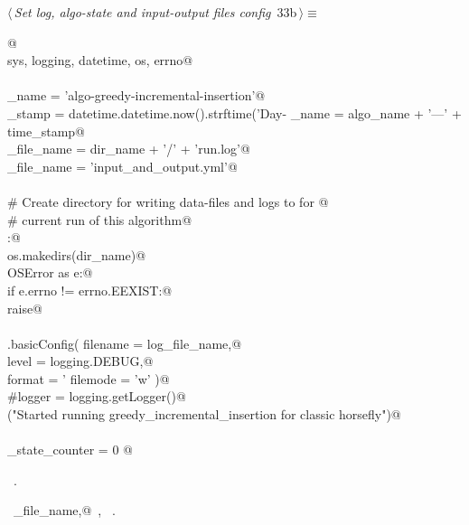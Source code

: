 \documentclass[11.5pt]{report}
\begin{document}
\begin{flushleft} \small\label{scrap26}\raggedright\small
{} $\langle\,${\itshape Set log, algo-state and input-output files config}\nobreak\ {\footnotesize {33b}}$\,\rangle\equiv$
\vspace{-1ex}
\begin{list}{}{} \item
\mbox{}\verb@  @\\
\mbox{}\verb@import sys, logging, datetime, os, errno@\\
\mbox{}\verb@@\\
\mbox{}\verb@algo_name     = 'algo-greedy-incremental-insertion'@\\
\mbox{}\verb@time_stamp    = datetime.datetime.now().strftime('Day-%Y-%m-%d_ClockTime-%H:%M:%S')@\\
\mbox{}\verb@dir_name      = algo_name + '---' + time_stamp@\\
\mbox{}\verb@log_file_name = dir_name + '/' + 'run.log'@\\
\mbox{}\verb@io_file_name  = 'input_and_output.yml'@\\
\mbox{}\verb@@\\
\mbox{}\verb@# Create directory for writing data-files and logs to for @\\
\mbox{}\verb@# current run of this algorithm@\\
\mbox{}\verb@try:@\\
\mbox{}\verb@    os.makedirs(dir_name)@\\
\mbox{}\verb@except OSError as e:@\\
\mbox{}\verb@    if e.errno != errno.EEXIST:@\\
\mbox{}\verb@        raise@\\
\mbox{}\verb@@\\
\mbox{}\verb@logging.basicConfig( filename = log_file_name,@\\
\mbox{}\verb@                     level    = logging.DEBUG,@\\
\mbox{}\verb@                     format   = '%(asctime)s: %(levelname)s: %(message)s',@\\
\mbox{}\verb@                     filemode = 'w' )@\\
\mbox{}\verb@#logger = logging.getLogger()@\\
\mbox{}\verb@info("Started running greedy_incremental_insertion for classic horsefly")@\\
\mbox{}\verb@@\\
\mbox{}\verb@algo_state_counter = 0 @\\
\mbox{}\verb@@{\NWsep}
\end{list}
\vspace{-1.5ex}
\footnotesize
\begin{list}{}{\setlength{\itemsep}{-\parsep}\setlength{\itemindent}{-\leftmargin}}
\item \NWtxtMacroRefIn\ .
\item \NWtxtIdentsDefed\nobreak\  \verb@io_file_name,@\nobreak\ , \verb@logger@\nobreak\ .
\item{}
\end{list}
\vspace{4ex}
\end{flushleft}
\end{document}
